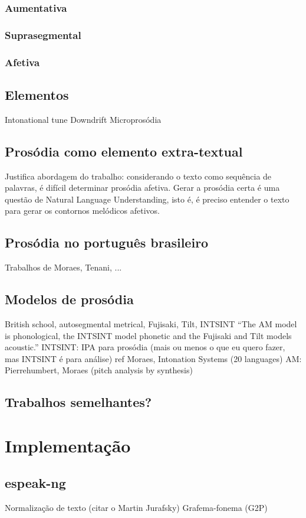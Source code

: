\subsubsection{Aumentativa}
\subsubsection{Suprasegmental}
\subsubsection{Afetiva}
\subsection{Elementos}
Intonational tune
Downdrift
Microprosódia
\subsection{Prosódia como elemento extra-textual}
Justifica abordagem do trabalho: considerando o texto como sequência de
palavras, é difícil determinar prosódia afetiva. Gerar a prosódia certa é uma
questão de Natural Language Understanding, isto é, é preciso entender o texto
para gerar os contornos melódicos afetivos.
\subsection{Prosódia no português brasileiro}
Trabalhos de Moraes, Tenani, ...
\subsection{Modelos de prosódia}
British school, autosegmental metrical, Fujisaki, Tilt, INTSINT
``The AM model is phonological, the INTSINT model phonetic and the Fujisaki and Tilt models acoustic.''
INTSINT: IPA para prosódia (mais ou menos o que eu quero fazer, mas INTSINT é
para análise)
ref Moraes, Intonation Systems (20 languages)
AM: Pierrehumbert, Moraes (pitch analysis by synthesis)
\subsection{Trabalhos semelhantes?}

\section{Implementação}
\subsection{espeak-ng}
Normalização de texto (citar o Martin Jurafsky)
Grafema-fonema (G2P)

